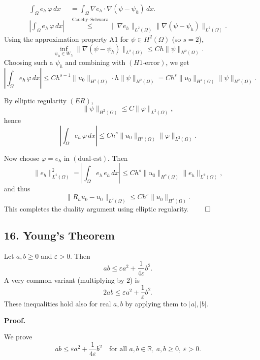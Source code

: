 \begin{align*}
    \int_\Omega e_h \,\varphi \, dx & = \int_\Omega \nabla e_h \cdot \nabla(\psi - \psi_h)\, dx.         \\
    \left|\int_\Omega e_h \,\varphi \, dx\right|
                                    & \overset{\text{Cauchy--Schwarz}}{\le} \|\nabla e_h\|_{L^2(\Omega)}
    \|\nabla(\psi - \psi_h)\|_{L^2(\Omega)}.
\end{align*}
Using the approximation property A1 for $\psi \in H^2(\Omega)$ (so $s=2$),
\[
    \inf_{\psi_h \in W_h}
    \|\nabla(\psi - \psi_h)\|_{L^2(\Omega)}
    \le
    C h \|\psi\|_{H^2(\Omega)}.
\]
Choosing such a $\psi_h$ and combining with \((H1\text{-error})\), we get
\[
    \left|
    \int_\Omega e_h \,\varphi \, dx
    \right|
    \le
    C h^{s-1} \|u_0\|_{H^s(\Omega)} \cdot h \|\psi\|_{H^2(\Omega)}
    =
    C h^{s} \|u_0\|_{H^s(\Omega)} \|\psi\|_{H^2(\Omega)}.
\]

By elliptic regularity \((ER)\),
\[
    \|\psi\|_{H^2(\Omega)} \le C \|\varphi\|_{L^2(\Omega)},
\]
hence
\[
    \left|
    \int_\Omega e_h \,\varphi \, dx
    \right|
    \le
    C h^{s} \|u_0\|_{H^s(\Omega)} \|\varphi\|_{L^2(\Omega)}.
    \tag{dual-est}
\]

Now choose $\varphi = e_h$ in \((\text{dual-est})\). Then
\[
    \|e_h\|_{L^2(\Omega)}^2
    =
    \left|
    \int_\Omega e_h \, e_h \, dx
    \right|
    \le
    C h^{s} \|u_0\|_{H^s(\Omega)} \|e_h\|_{L^2(\Omega)},
\]
and thus
\[
    \|R_h u_0 - u_0\|_{L^2(\Omega)}
    \le
    C h^{s} \|u_0\|_{H^s(\Omega)}.
    \tag{L2-error}
\]
This completes the duality argument using elliptic regularity. \hfill$\qed$

\subsection*{16. Young's Theorem}
Let $a,b \ge 0$ and $\varepsilon > 0$. Then
\[
    ab \le \varepsilon a^2 + \frac{1}{4\varepsilon} b^2. \tag{young}
\]
A very common variant (multiplying by $2$) is
\[
    2ab \le \varepsilon a^2 + \frac{1}{\varepsilon} b^2. \tag{young2}
\]
These inequalities hold also for real $a,b$ by applying them to $|a|,|b|$.

\textbf{Proof.}

We prove
\[
    ab \le \varepsilon a^2 + \frac{1}{4\varepsilon} b^2
    \quad \text{for all } a,b \in \mathbb{R},\ a,b \ge 0,\ \varepsilon>0.
\]

